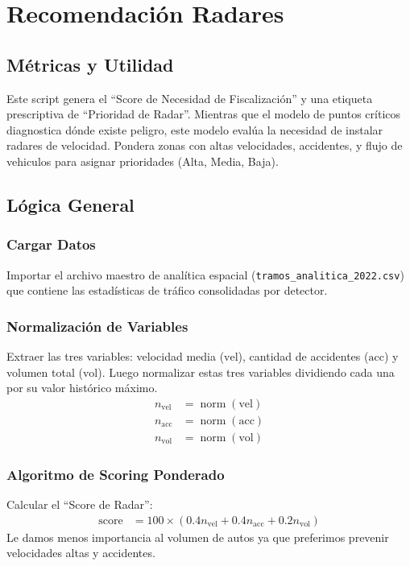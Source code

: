 \section{Recomendación Radares}

\subsection{Métricas y Utilidad}

Este script genera el ``Score de Necesidad de Fiscalización'' y una etiqueta 
prescriptiva de ``Prioridad de Radar''. Mientras que el modelo de puntos 
críticos diagnostica dónde existe peligro, este modelo evalúa la necesidad
de instalar radares de velocidad. Pondera zonas con altas velocidades,
accidentes, y flujo de vehiculos para asignar prioridades (Alta, Media, Baja).

\subsection{Lógica General}

\subsubsection*{Cargar Datos}
Importar el archivo maestro de analítica espacial
(\texttt{tramos\_analitica\_2022.csv}) que contiene las estadísticas 
de tráfico consolidadas por detector.

\subsubsection*{Normalización de Variables}

Extraer las tres variables: velocidad media (\(\mathrm{vel}\)), 
cantidad de accidentes (\(\mathrm{acc}\)) y volumen total
(\(\mathrm{vol}\)).
Luego normalizar estas tres variables dividiendo cada una por su valor 
histórico máximo. 
\begin{align*}
    n_{\mathrm{vel}} &= \operatorname*{norm}(\mathrm{vel}) \\
    n_{\mathrm{acc}} &= \operatorname*{norm}(\mathrm{acc}) \\
    n_{\mathrm{vol}} &= \operatorname*{norm}(\mathrm{vol}) 
\end{align*}

\subsubsection*{Algoritmo de Scoring Ponderado}
Calcular el ``Score de Radar'': 
\begin{align*}
    \mathrm{score} &= 100 \times \left(
        0.4n_{\mathrm{vel}} + 
        0.4n_{\mathrm{acc}} + 
        0.2n_{\mathrm{vol}}
    \right)
\end{align*}
Le damos menos importancia al volumen de autos ya que preferimos prevenir 
velocidades altas y accidentes.

